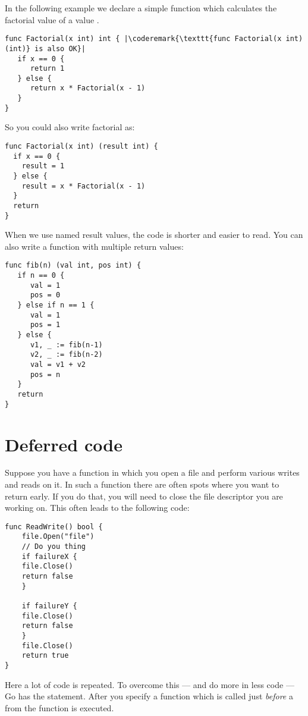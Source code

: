 In the following example we declare a simple function which calculates
the factorial value of a value .

\begin{lstlisting}
func Factorial(x int) int { |\coderemark{\texttt{func Factorial(x int) (int)} is also OK}|
   if x == 0 {
      return 1
   } else {
      return x * Factorial(x - 1)
   }
}
\end{lstlisting}
So you could also write factorial as:
\begin{lstlisting}
func Factorial(x int) (result int) {
  if x == 0 {
    result = 1	
  } else {
    result = x * Factorial(x - 1)
  }
  return
}
\end{lstlisting}
When we use named result values, the code is shorter and
easier to read.
You can also write a function with multiple return values:
\begin{lstlisting}
func fib(n) (val int, pos int) {
   if n == 0 {
      val = 1
      pos = 0
   } else if n == 1 {
      val = 1
      pos = 1
   } else {
      v1, _ := fib(n-1)
      v2, _ := fib(n-2)
      val = v1 + v2
      pos = n
   }
   return
}
\end{lstlisting}

\section{Deferred code}
Suppose you have a function in which you open a file and perform various
writes and reads on it. In such a function there are often spots where
you want to return early. If you do that, you will need to close the file
descriptor you are working on. This often leads to the following code:
\begin{lstlisting}[caption=Without \func{defer}]
func ReadWrite() bool {
    file.Open("file")
    // Do you thing
    if failureX {
	file.Close()
	return false
    }

    if failureY {
	file.Close()
	return false
    }
    file.Close()
    return true
}
\end{lstlisting}
Here a lot of code is repeated. To overcome this ---
and do more in less code --- Go has the
 statement. After
 you specify a function which is called just \emph{before} a
 from the function is executed.

